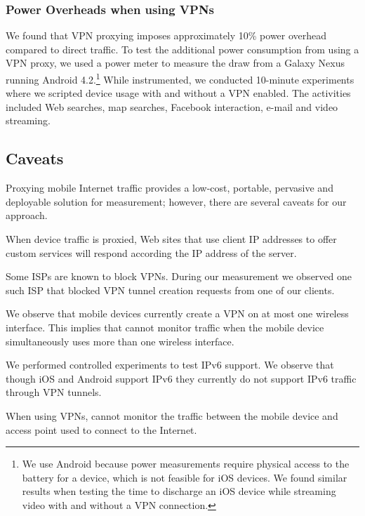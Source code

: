 
\subsubsection{Power Overheads when using VPNs}

We found that VPN proxying imposes approximately 10\% power overhead 
compared to direct traffic. To test the additional power consumption from using a VPN proxy, we used a power meter 
to measure the draw from a Galaxy Nexus running Android 4.2.\footnote{We use Android because power measurements require physical access to 
the battery for a device, which is not feasible for iOS devices. We found similar results when testing the time to discharge 
an iOS device while streaming video with and without a VPN connection.} While instrumented, we conducted 
10-minute experiments where we scripted device usage with and without a VPN 
enabled. The activities included Web searches, map searches, Facebook interaction, 
e-mail and video streaming. 

%
%

\subsection{Caveats}

Proxying mobile Internet traffic provides a low-cost, portable, pervasive and deployable solution for measurement; however, 
there are several caveats for our approach.

\begin{packedenumerate}
\item When device traffic is proxied, Web sites that use client IP addresses to offer custom services will respond according the IP address of the \platname server. 
\item Some ISPs are known to block VPNs. During our measurement we observed one such ISP that blocked VPN tunnel creation requests from one of our clients.
\item We observe that mobile devices currently create a VPN on at most one wireless interface. This implies that \platname cannot monitor traffic when the mobile device simultaneously uses more than one wireless interface.  
\item We performed controlled experiments to test IPv6 support. We observe that though iOS and Android support IPv6 they currently do not support IPv6 traffic through VPN tunnels. 
\item When using VPNs, \platname cannot monitor the traffic between the mobile device and access point used to connect to the Internet. 
\end{packedenumerate}






